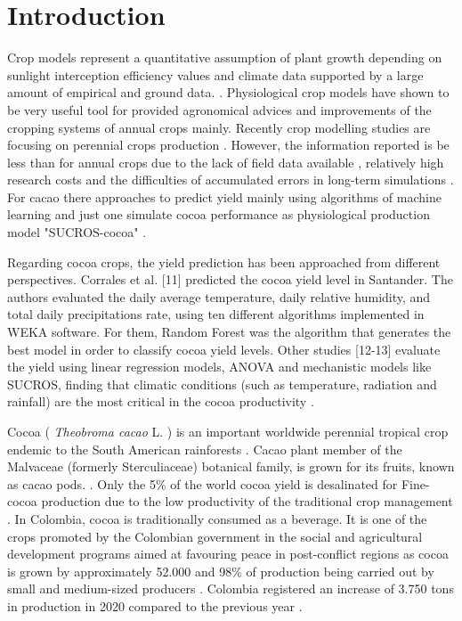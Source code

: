 \documentclass[gene,journal,article,submit,moreauthors,pdftex]{Definitions/mdpi}
\begin{document}

\section{Introduction}

Crop models represent a quantitative assumption of plant growth depending on sunlight interception efficiency values and climate data supported by a large amount of empirical and ground data. \citep{Reynolds2018}. Physiological crop models have shown to be very useful tool for provided agronomical advices and improvements of the cropping systems of annual crops mainly. Recently crop modelling studies are focusing on  perennial crops  production \citep{zuidema2005, Zao2019simple, Bai2020, Romero2021}. However, the information reported  is be less than for annual crops due to the lack of field data available , relatively high research costs and the difficulties of accumulated errors in long-term simulations \citep{zuidema2005}. For cacao there  approaches  to predict yield mainly  using algorithms of machine learning \citep{lamos2020} and just one simulate cocoa performance as physiological production model "SUCROS-cocoa" \citep{zuidema2005}. 

Regarding cocoa crops, the yield prediction has been approached from different perspectives. Corrales et al. [11] predicted the cocoa yield level in Santander. The authors evaluated the daily average temperature, daily relative humidity, and total
daily precipitations rate, using ten different algorithms implemented in WEKA software. For them, Random Forest was the algorithm that generates the best model in order to classify cocoa yield levels. Other studies [12-13] evaluate the yield using linear regression models, ANOVA and mechanistic models like SUCROS, finding that climatic conditions (such as temperature, radiation and rainfall) are the most
critical in the cocoa productivity \citep{lamos2020}.

Cocoa ( \textit{Theobroma cacao }L. ) is an important worldwide perennial tropical crop endemic to the South American rainforests \citep{zuidema2005, motamayor2002, argout2011, Rodriguez2019}. Cacao plant member of the Malvaceae (formerly Sterculiaceae)  botanical family, is grown for its fruits, known as cacao pods.  \citep{ Niemenak2010, suarez2021}. Only the 5\% of the world cocoa yield is desalinated for Fine-cocoa production due to the low productivity of  the traditional crop management \citep{argout2011}.  In Colombia, cocoa  is  traditionally  consumed  as  a  beverage. It is one of the crops promoted by the Colombian government in the social and agricultural development  programs aimed at favouring peace in post-conflict regions \citep{Rodriguez2019, Abbott2019} as cocoa is grown by approximately 52.000 \citep{Gutierrez2020} and 98\% of production being carried out by small and medium-sized producers \citep{Garcia2014, Escobar2020}. Colombia registered an increase of 3.750 tons in production in 2020 compared to the previous year \citep{lamos2020}. 
\end{document}
